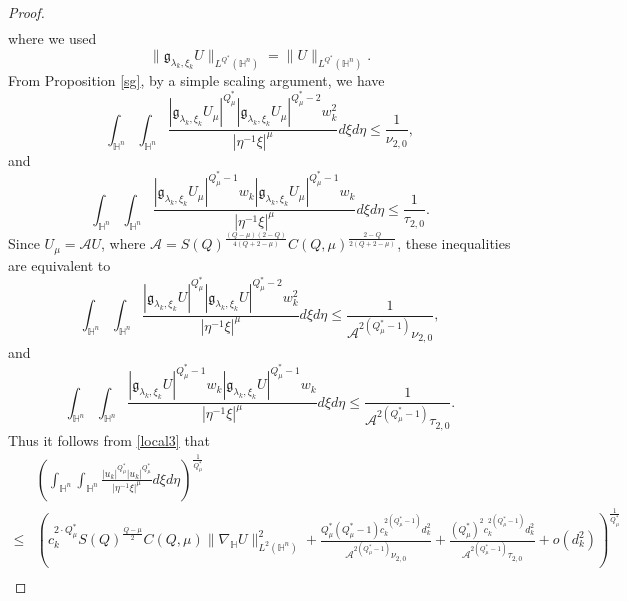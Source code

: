 \documentclass[11pt]{article}
\begin{document}
\begin{proof}
\begin{align*}
 \end{align*}
{where we used}
 \begin{equation*}
 \|\mathfrak{g}_{\lambda_k,\xi_k}U\|_{L^{Q^{\ast}}(\mathbb{H}^{n})}=\|U\|_{L^{Q^{\ast}}(\mathbb{H}^{n})}.
 \end{equation*}
From Proposition \ref{sg}, by a simple scaling argument, we have
\begin{equation*}
 \int_{\mathbb{H}^{n}}\int_{\mathbb{H}^{n}}\frac{|\mathfrak{g}_{\lambda_k,\xi_k}U_\mu|^{Q^{\ast}_{\mu}}|\mathfrak{g}_{\lambda_k,\xi_k}U_\mu|
^{Q^{\ast}_{\mu}-2} w_k^2}{|\eta^{-1}\xi|^{\mu}}{d}\xi{d}\eta\leq\frac{1}{\nu_{2,0}},
\end{equation*}
and
\begin{equation*}
 \int_{\mathbb{H}^{n}}\int_{\mathbb{H}^{n}}\frac{|\mathfrak{g}_{\lambda_k,\xi_k}U_\mu|^{Q^{\ast}_{\mu}-1}w_k|\mathfrak{g}_{\lambda_k,\xi_k}U_\mu|
^{Q^{\ast}_{\mu}-1} w_k}{|\eta^{-1}\xi|^{\mu}}{d}\xi{d}\eta\leq\frac{1}{\tau_{2,0}}.
\end{equation*}
{Since $U_\mu=\mathcal AU$, where $\mathcal A=S(Q)^{\frac{(Q-\mu)(2-Q)}{4(Q+2-\mu)}}C(Q,\mu)^{\frac{2-Q}{2(Q+2-\mu)}}$, these inequalities are equivalent to}
\begin{equation*}
 \int_{\mathbb{H}^{n}}\int_{\mathbb{H}^{n}}\frac{|\mathfrak{g}_{\lambda_k,\xi_k}U|^{Q^{\ast}_{\mu}}|\mathfrak{g}_{\lambda_k,\xi_k}U|
^{Q^{\ast}_{\mu}-2} w_k^2}{|\eta^{-1}\xi|^{\mu}}{d}\xi{d}\eta\leq\frac{1}{\mathcal{A}^{2(Q^{\ast}_{\mu}-1)}\nu_{2,0}},
\end{equation*}
and
\begin{equation*}
 \int_{\mathbb{H}^{n}}\int_{\mathbb{H}^{n}}\frac{|\mathfrak{g}_{\lambda_k,\xi_k}U|^{Q^{\ast}_{\mu}-1}w_k|\mathfrak{g}_{\lambda_k,\xi_k}U|
^{Q^{\ast}_{\mu}-1} w_k}{|\eta^{-1}\xi|^{\mu}}{d}\xi{d}\eta\leq\frac{1}{\mathcal{A}^{2(Q^{\ast}_{\mu}-1)}\tau_{2,0}}.
\end{equation*}
 Thus it follows from \eqref{local3} that
 \begin{align*}
 &\left(\int_{\mathbb{H}^{n}}\int_{\mathbb{H}^{n}}\frac{|u_k|^{Q^{\ast}_{\mu}}|u_k|
^{Q^{\ast}_{\mu}}}{|\eta^{-1}\xi|^{\mu}}{d}\xi{d}\eta\right)^{\frac{1}{Q^{\ast}_{\mu}}}\\
\leq& \left(c_k^{2\cdot Q_{\mu}^{\ast}} S(Q)^{\frac{Q-\mu}{2}}C(Q,\mu) \|\nabla_\mathbb{H}U\|^2_{L^{2}(\mathbb{H}^{n})}+\frac{Q_{\mu}^{\ast}(Q_{\mu}^{\ast}-1)c_k^{2(Q_{\mu}^{\ast}-1)}d_k^2}{\mathcal{A}^{2(Q^{\ast}_{\mu}-1)}\nu_{2,0}}
+\frac{(Q_{\mu}^{\ast})^2c_k^{2(Q_{\mu}^{\ast}-1)}d_k^2}{\mathcal{A}^{2(Q^{\ast}_{\mu}-1)}\tau_{2,0}}+o(d_k^2)\right)^{\frac{1}{Q^{\ast}_{\mu}}}\\

\end{align*}
\end{proof}
\end{document}

